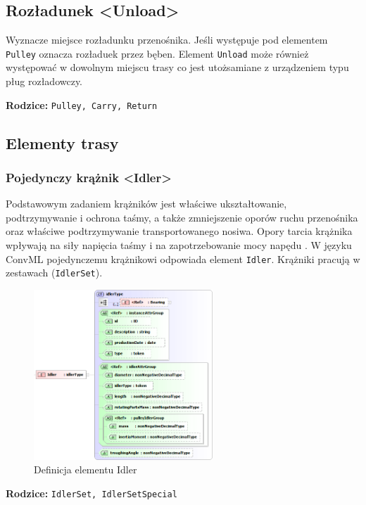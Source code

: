\documentclass[12pt,a4paper]{article}
\begin{document}
\subsection{Rozładunek <Unload>}
Wyznacze miejsce rozładunku przenośnika. Jeśli występuje pod elementem {\tt Pulley}
oznacza rozładuek przez bęben.  Element {\tt Unload} może również występować w
dowolnym miejscu trasy co jest utożsamiane z urządzeniem typu pług rozładowczy.

\noindent\textbf{Rodzice:} \texttt{Pulley, Carry, Return}


\subsection{Elementy trasy}

\subsubsection{Pojedynczy krążnik <Idler>}
Podstawowym zadaniem krążników jest właściwe ukształtowanie, podtrzymywanie i
ochrona taśmy, a także zmniejszenie oporów ruchu przenośnika oraz właściwe
podtrzymywanie transportowanego nosiwa.  Opory tarcia krążnika wpływają na siły
napięcia taśmy i na zapotrzebowanie mocy napędu \cite{Antoniak2005}.  W języku
ConvML pojedynczemu krążnikowi odpowiada element {\tt Idler}. Krążniki pracują w
zestawach ({\tt IdlerSet}).

\begin{figure}[H]
  \centering
  \includegraphics[width=0.6\textwidth]{png/liquid/Idler}
  \caption{Definicja elementu Idler}
  \label{fig:idler-xsd}
\end{figure}

\noindent\textbf{Rodzice:} \texttt{IdlerSet, IdlerSetSpecial}
\end{document}
